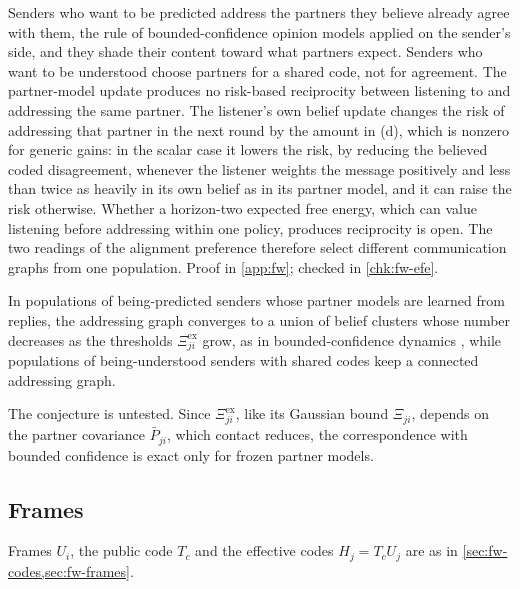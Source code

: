Senders who want to be predicted address the partners they believe already agree with them, the rule of bounded-confidence opinion models \citep{deffuant2000mixing,hegselmann2002opinion} applied on the sender's side, and they shade their content toward what partners expect. Senders who want to be understood choose partners for a shared code, not for agreement. The partner-model update produces no risk-based reciprocity between listening to and addressing the same partner. The listener's own belief update changes the risk of addressing that partner in the next round by the amount in (d), which is nonzero for generic gains: in the scalar case it lowers the risk, by reducing the believed coded disagreement, whenever the listener weights the message positively and less than twice as heavily in its own belief as in its partner model, and it can raise the risk otherwise. Whether a horizon-two expected free energy, which can value listening before addressing within one policy, produces reciprocity is open. The two readings of the alignment preference therefore select different communication graphs from one population. Proof in \cref{app:fw}; checked in \cref{chk:fw-efe}.

\begin{conjecture}\label{conj:fw-fragmentation}
In populations of being-predicted senders whose partner models are learned from replies, the addressing graph converges to a union of belief clusters whose number decreases as the thresholds $\Xi^{\mathrm{ex}}_{ji}$ grow, as in bounded-confidence dynamics \citep{hegselmann2002opinion}, while populations of being-understood senders with shared codes keep a connected addressing graph.
\end{conjecture}

The conjecture is untested. Since $\Xi^{\mathrm{ex}}_{ji}$, like its Gaussian bound $\Xi_{ji}$, depends on the partner covariance $\bar P_{ji}$, which contact reduces, the correspondence with bounded confidence is exact only for frozen partner models.

\subsection{Frames}\label{sup:fw-frames}

Frames $U_i$, the public code $T_c$ and the effective codes $H_j=T_cU_j$ are as in \cref{sec:fw-codes,sec:fw-frames}.

